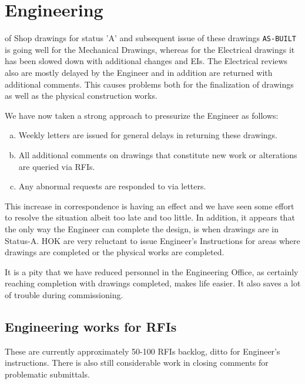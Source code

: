 \chapter{Engineering}

 of Shop drawings for status 'A' and subsequent issue of these drawings \texttt{AS-BUILT} is going well for the Mechanical Drawings, whereas for the Electrical drawings it has been slowed down with additional changes and EIs. The Electrical reviews also are mostly delayed by the Engineer and in addition are returned with additional comments. This causes problems both for the finalization of drawings as well as the physical construction works.

We have now taken a strong approach to pressurize the Engineer as follows:

\begin{enumerate}[a.)]
\item Weekly letters are issued for general delays in returning these drawings.
\item All additional comments on drawings that constitute new work or alterations are queried via RFIs.
\item Any abnormal requests are responded to via letters.
\end{enumerate}

This increase in correspondence is having an effect and we have seen some effort to resolve the situation albeit too late and too little. In addition, it appears that the only way the Engineer can complete the design, is when drawings are in Status-A. HOK are very reluctant to issue Engineer's Instructions for areas where drawings are completed or the physical works are completed.

It is a pity that we have reduced personnel in the Engineering Office, as certainly reaching completion with drawings completed, makes life easier. It also saves a lot of trouble during commissioning.

\section{Engineering works for RFIs}

These are currently approximately 50-100 RFIs backlog, ditto for Engineer's instructions. There is also still considerable work in closing comments for problematic submittals.